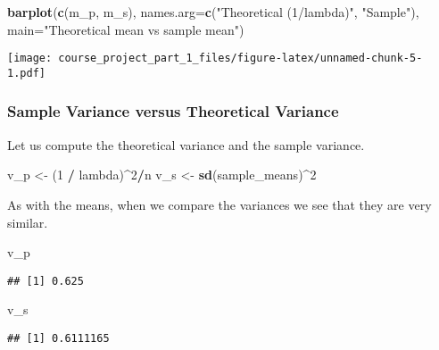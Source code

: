 \documentclass[]{article}
\newenvironment{Shaded}{\begin{snugshade}}{\end{snugshade}}
\newcommand{\KeywordTok}[1]{\textcolor[rgb]{0.13,0.29,0.53}{\textbf{#1}}}
\newcommand{\DataTypeTok}[1]{\textcolor[rgb]{0.13,0.29,0.53}{#1}}
\newcommand{\DecValTok}[1]{\textcolor[rgb]{0.00,0.00,0.81}{#1}}
\newcommand{\StringTok}[1]{\textcolor[rgb]{0.31,0.60,0.02}{#1}}
\newcommand{\OperatorTok}[1]{\textcolor[rgb]{0.81,0.36,0.00}{\textbf{#1}}}
\newcommand{\NormalTok}[1]{#1}
\begin{document}
\begin{Shaded}
\begin{Highlighting}[]
\KeywordTok{barplot}\NormalTok{(}\KeywordTok{c}\NormalTok{(m_p, m_s), }\DataTypeTok{names.arg=}\KeywordTok{c}\NormalTok{(}\StringTok{"Theoretical (1/lambda)"}\NormalTok{, }\StringTok{"Sample"}\NormalTok{), }\DataTypeTok{main=}\StringTok{"Theoretical mean vs sample mean"}\NormalTok{)}
\end{Highlighting}
\end{Shaded}

\texttt{[image: course\_project\_part\_1\_files/figure-latex/unnamed-chunk-5-1.pdf]}

\subsubsection{Sample Variance versus Theoretical
Variance}\label{sample-variance-versus-theoretical-variance}

Let us compute the theoretical variance and the sample variance.

\begin{Shaded}
\begin{Highlighting}[]
\NormalTok{v_p <-}\StringTok{ }\NormalTok{(}\DecValTok{1} \OperatorTok{/}\StringTok{ }\NormalTok{lambda)}\OperatorTok{^}\DecValTok{2}\OperatorTok{/}\NormalTok{n}
\NormalTok{v_s <-}\StringTok{ }\KeywordTok{sd}\NormalTok{(sample_means)}\OperatorTok{^}\DecValTok{2}
\end{Highlighting}
\end{Shaded}

As with the means, when we compare the variances we see that they are
very similar.

\begin{Shaded}
\begin{Highlighting}[]
\NormalTok{v_p}
\end{Highlighting}
\end{Shaded}

\begin{verbatim}
## [1] 0.625
\end{verbatim}

\begin{Shaded}
\begin{Highlighting}[]
\NormalTok{v_s}
\end{Highlighting}
\end{Shaded}

\begin{verbatim}
## [1] 0.6111165
\end{verbatim}
\end{document}
